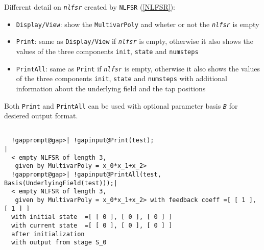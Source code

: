\documentclass[a4paper,11pt]{report}
\begin{document}
{{{ Different detail on \mbox{\texttt{\mdseries\slshape nlfsr}} created by \texttt{NLFSR} (\ref{NLFSR}): 
\begin{itemize}
\item  \texttt{Display/View}: show the \texttt{MultivarPoly} and wheter or not the \mbox{\texttt{\mdseries\slshape nlfsr}} is empty
\item  \texttt{Print}: same as \texttt{Display/View} if \mbox{\texttt{\mdseries\slshape nlfsr}} is empty, otherwise it also shows the values of the three components \texttt{init}, \texttt{state} and \texttt{numsteps}
\item  \texttt{PrintAll}: same as \texttt{Print} if \mbox{\texttt{\mdseries\slshape nlfsr}} is empty, otherwise it also shows the values of the three components \texttt{init}, \texttt{state} and \texttt{numsteps} with additional information about the underlying field and the tap positions
\end{itemize}
 Both \texttt{Print} and \texttt{PrintAll} can be used with optional parameter basis \mbox{\texttt{\mdseries\slshape B}} for desiered output format. 
\begin{Verbatim}[commandchars=!@|,fontsize=\small,frame=single,label=Example]
  
  !gapprompt@gap>| !gapinput@Print(test);                                 |
  < empty NLFSR of length 3,
   given by MultivarPoly = x_0*x_1+x_2> 
  !gapprompt@gap>| !gapinput@PrintAll(test, Basis(UnderlyingField(test)));|
  < empty NLFSR of length 3,
   given by MultivarPoly = x_0*x_1+x_2> with feedback coeff =[ [ 1 ], [ 1 ] ]
  with initial state  =[ [ 0 ], [ 0 ], [ 0 ] ]
  with current state  =[ [ 0 ], [ 0 ], [ 0 ] ]
  after initialization 
  with output from stage S_0
  
\end{Verbatim}
 }

 }

 }

 
\end{document}

